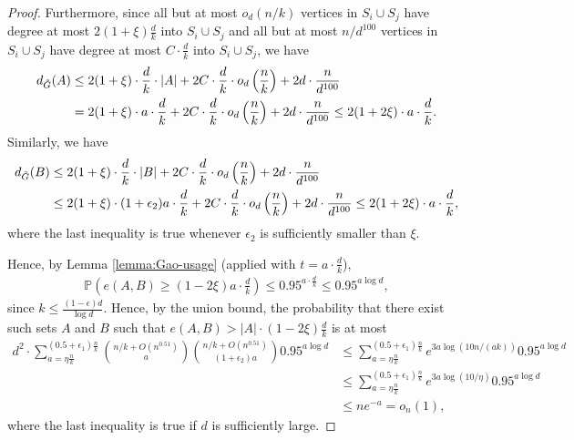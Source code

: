 \documentclass[notitlepage]{scrartcl}
\renewcommand{\Pr}{\mathbb{P}}
\begin{document}
\begin{proof}
    Furthermore, since all but at most $o_d(n/k)$ vertices in $S_i \cup S_j$ have degree at most $2(1+\xi) \frac{d}{k}$ into $S_i \cup S_j$ and all but at most $n/d^{100}$ vertices in $S_i \cup S_j$ have degree at most $C\cdot \frac{d}{k}$ into $S_i \cup S_j$, we have
    \begin{align*}
        d_{\Tilde{G}}(A) &\le 2(1+\xi) \cdot \frac{d}{k} \cdot |A| + 2C \cdot \frac{d}{k} \cdot  o_d\left(\frac{n}{k}\right) + 2d \cdot \frac{n}{d^{100}}
        \\& = 2(1+\xi) \cdot a \cdot \frac{d}{k} + 2C \cdot \frac{d}{k} \cdot  o_d\left(\frac{n}{k}\right) + 2d \cdot \frac{n}{d^{100}} \le 2(1+2\xi) \cdot a \cdot \frac{d}{k}.
    \end{align*}
    Similarly, we have
    \begin{align*}
        d_{\Tilde{G}}(B) &\le 2(1+\xi) \cdot \frac{d}{k} \cdot |B| + 2C \cdot \frac{d}{k} \cdot  o_d\left(\frac{n}{k}\right) + 2d \cdot \frac{n}{d^{100}}
        \\&\le  2(1+\xi) \cdot (1+\epsilon_2) a \cdot \frac{d}{k} + 2C \cdot \frac{d}{k} \cdot  o_d\left(\frac{n}{k}\right) + 2d \cdot \frac{n}{d^{100}} \le 2(1+2\xi) \cdot a \cdot \frac{d}{k},
    \end{align*}
    where the last inequality is true whenever $\epsilon_2$ is sufficiently smaller than $\xi$.
    
    
    Hence, by Lemma \ref{lemma:Gao-usage} (applied with $t = a \cdot \frac{d}{k}$),
    \begin{align*}
        \Pr\left(e(A, B) \ge (1-2\xi) a \cdot \frac{d}{k}\right) \le 0.95^{a \cdot \frac{d}{k}}\le0.95^{a\log d},
    \end{align*}
    since $k\le \frac{(1-\epsilon)d}{\log d}$. Hence, by the union bound, the probability that there exist such sets $A$ and $B$ such that $e(A, B) > |A| \cdot (1-2\xi) \frac{d}{k}$ is at most
    \begin{align*}
        d^2 \cdot \sum_{a = \eta \frac{n}{k}}^{(0.5 + \epsilon_1)\frac{n}{k}} \binom{n/k + O(n^{0.51})}{a}\binom{n/k + O(n^{0.51})}{(1+\epsilon_2)a} 0.95^{a \log d} &\le \sum_{a = \eta \frac{n}{k}}^{(0.5 + \epsilon_1)\frac{n}{k}} e^{3a \log(10n/(ak))} 0.95^{a \log d} \\
        &\le \sum_{a = \eta \frac{n}{k}}^{(0.5 + \epsilon_1)\frac{n}{k}} e^{3a \log (10/\eta)} 0.95^{a \log d} \\
        &\le n e^{-a} = o_n(1),
    \end{align*}
    where the last inequality is true if $d$ is sufficiently large.
\end{proof}
\end{document}
